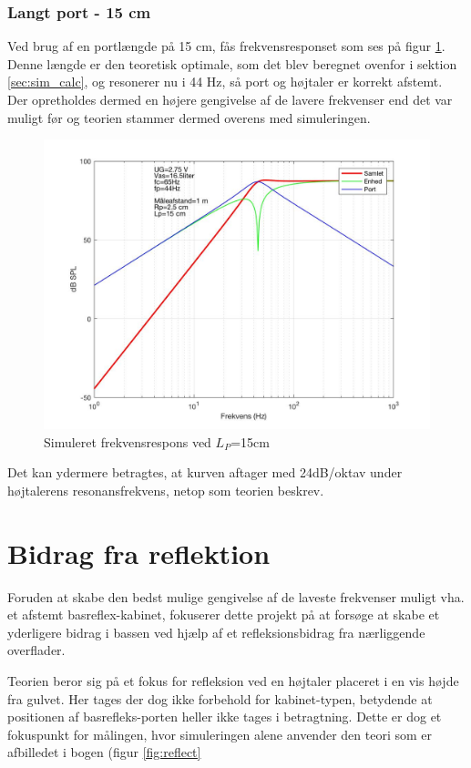 \subsubsection{Langt port - 15 cm}

Ved brug af en portlængde på 15 cm, fås frekvensresponset som ses på figur \ref{fig:sim_langt}. \\
Denne længde er den teoretisk optimale, som det blev beregnet ovenfor i sektion \ref{sec:sim_calc}, og resonerer nu i 44 Hz, så port og højtaler er korrekt afstemt. 
Der opretholdes dermed en højere gengivelse af de lavere frekvenser end det var muligt før og teorien stammer dermed overens med simuleringen. 

\begin{figure}[h!]
	\centering
	\includegraphics[width=.8\textwidth]{Pics/sim_lang}
	\caption{Simuleret frekvensrespons ved $L_P$=15cm } 
	\label{fig:sim_langt}
\end{figure}

Det kan ydermere betragtes, at kurven aftager med 24dB/oktav under højtalerens resonansfrekvens, netop som teorien beskrev.\cite{Elektroakustik}

\section{Bidrag fra reflektion}
\label{sec:reflection}
Foruden at skabe den bedst mulige gengivelse af de laveste frekvenser muligt vha. et afstemt basreflex-kabinet, fokuserer dette projekt på at forsøge at skabe et yderligere bidrag i bassen ved hjælp af et refleksionsbidrag fra nærliggende overflader. 

Teorien beror sig på et fokus for refleksion ved en højtaler placeret i en vis højde fra gulvet. Her tages der dog ikke forbehold for kabinet-typen, betydende at positionen af basrefleks-porten heller ikke tages i betragtning. 
Dette er dog et fokuspunkt for målingen, hvor simuleringen alene anvender den teori som er afbilledet i bogen (figur \ref{fig:reflect}
\cite{Elektroakustik}


